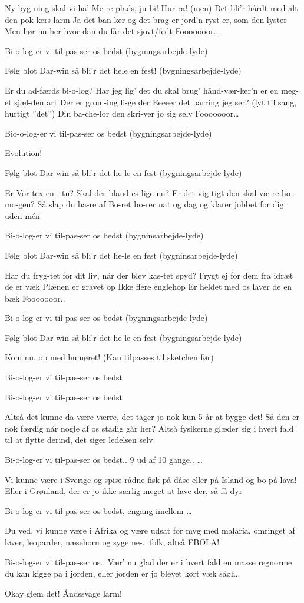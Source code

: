 \documentclass[a4paper,11pt]{article}
\begin{document}
\begin{song}
Ny byg-ning skal vi ha’
Me-re plads, ju-bi! Hur-ra!
(men) Det bli’r hårdt med alt den pok-kers larm
Ja det ban-ker og det brag-er
jord’n ryst-er, som den lyster
Men hør nu her hvor-dan du får det sjovt/fedt
Fooooooor..

Bi-o-log-er vi til-pas-ser os bedst
(bygningsarbejde-lyde)

Følg blot Dar-win så bli’r det hele en fest!
(bygningsarbejde-lyde)

Er du ad-færds bi-o-log?
Har jeg lig’ det du skal brug’
hånd-vær-ker’n er en meg-et sjæl-den art
Der er grom-ing li-ge der 
Eeeeer det parring jeg ser? (lyt til sang, hurtigt ”det”)
Din ba-che-lor den skri-ver jo sig selv
Fooooooor…

Bio-o-log-er vi til-pas-ser os bedst
(bygningsarbejde-lyde)

Evolution!

Følg blot Dar-win så bli’r det he-le en fest
(bygningsarbejde-lyde)

Er Vor-tex-en i-tu?
Skal der bland-es lige nu?
Er det vig-tigt den skal væ-re ho-mo-gen?
Så slap du ba-re af
Bo-ret bo-rer nat og dag
og klarer jobbet for dig uden mén

Bi-o-log-er vi til-pas-ser os bedst
(bygninsarbejde-lyde)

Følg blot Dar-win så bli’r det he-le en fest
(bygninsarbejde-lyde)

Har du fryg-tet for dit liv, når der blev kas-tet spyd?
Frygt ej for dem fra idræt de er væk
Plænen er gravet op 
Ikke flere englehop
Er heldet med os laver de en bæk
Fooooooor..

Bi-o-log-er vi til-pas-ser os bedst
(bygningsarbejde-lyde)

Følg blot Dar-win så bli’r det he-le en fest
(bygningsarbejde-lyde)

Kom nu, op med humøret! (Kan tilpasses til sketchen før) 

Bi-o-log-er vi til-pas-ser os bedst

Bi-o-log-er vi til-pas-ser os bedst

Altså det kunne da være værre, det tager jo nok kun 5 år at bygge det!
Så den er nok færdig når nogle af os stadig går her? Altså fysikerne glæder sig i hvert fald til at flytte derind, det siger ledelsen selv

Bi-o-log-er vi til-pas-ser os bedst.. 9 ud af 10 gange..
…

Vi kunne være i Sverige og spise rådne fisk på dåse eller på Island og bo på lava!
Eller i Grønland, der er jo ikke særlig meget at lave der, så få dyr

Bi-o-log-er vi til-pas-ser os bedst, engang imellem
…

Du ved, vi kunne være i Afrika og være udsat for myg med malaria, omringet af løver, leoparder, næsehorn og syge ne-.. folk, altså EBOLA!

Bi-o-log-er vi til-pas-ser os.. Vær’ nu glad der er i hvert fald en masse regnorme du kan kigge på i jorden, eller jorden er jo blevet kørt væk såøh..

Okay glem det! Åndssvage larm!

\end{song}
\end{document}
